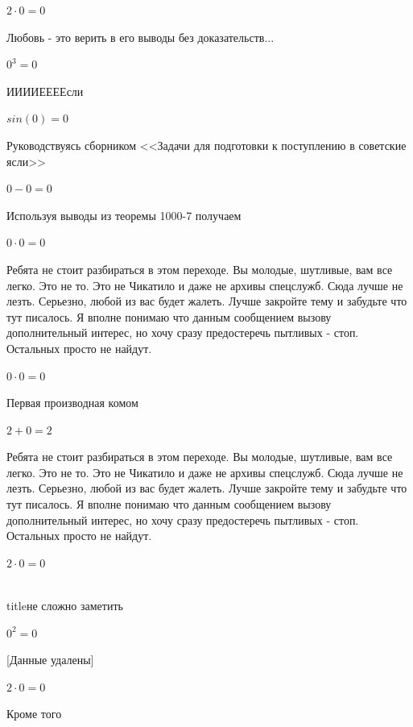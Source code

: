 \documentclass[12pt,a4paper,fleqn]{article}
\begin{document}
\begin{center}$2 \cdot 0 = 0$\end{center}
Любовь - это верить в его выводы без доказательств...

\begin{center}$0^{3} = 0$\end{center}
ИИИИЕЕЕЕсли\cite{link3}

\begin{center}$sin(0) = 0$\end{center}
Руководствуясь сборником <<Задачи для подготовки к поступлению в советские ясли>>\cite{link1}

\begin{center}$0-0 = 0$\end{center}
Используя выводы из теоремы 1000-7 получаем

\begin{center}$0 \cdot 0 = 0$\end{center}
Ребята не стоит разбираться в этом переходе. Вы молодые, шутливые, вам все легко. Это не то. Это не Чикатило и даже не архивы спецслужб. Сюда лучше не лезть. Серьезно, любой из вас будет жалеть. Лучше закройте тему и забудьте что тут писалось. Я вполне понимаю что данным сообщением вызову дополнительный интерес, но хочу сразу предостеречь пытливых - стоп. Остальных просто не найдут.

\begin{center}$0 \cdot 0 = 0$\end{center}
Первая производная комом\cite{link2}

\begin{center}$2+0 = 2$\end{center}
Ребята не стоит разбираться в этом переходе. Вы молодые, шутливые, вам все легко. Это не то. Это не Чикатило и даже не архивы спецслужб. Сюда лучше не лезть. Серьезно, любой из вас будет жалеть. Лучше закройте тему и забудьте что тут писалось. Я вполне понимаю что данным сообщением вызову дополнительный интерес, но хочу сразу предостеречь пытливых - стоп. Остальных просто не найдут.

\begin{center}$2 \cdot 0 = 0$\end{center}
\\ title{не сложно заметить} 

\begin{center}$0^{2} = 0$\end{center}
[Данные удалены]

\begin{center}$2 \cdot 0 = 0$\end{center}
Кроме того
\end{document}
